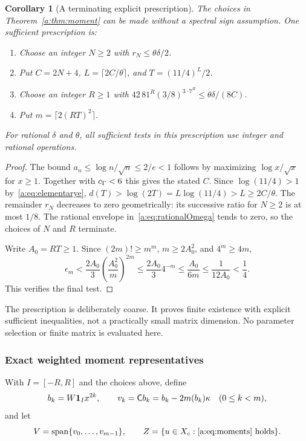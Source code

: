 \documentclass[11pt,a4paper]{article}
\numberwithin{equation}{section}
\newtheorem{corollary}[theorem]{Corollary}
\theoremstyle{definition}\newtheorem{definition}[theorem]{Definition}
\theoremstyle{remark}\newtheorem{remark}[theorem]{Remark}
\begin{document}
\begin{corollary}[A terminating explicit prescription]\label{a:cor:choices}
The choices in Theorem~\ref{a:thm:moment} can be made without a spectral sign assumption. One sufficient prescription is:
\begin{enumerate}
\item Choose an integer $N\ge2$ with $r_N\le\theta\delta/2$.
\item Put $C=2N+4$, $L=\lceil2C/\theta\rceil$, and $T=(11/4)^L/2$.
\item Choose an integer $R\ge1$ with
$42\,81^R(3/8)^{3\cdot7^R}\le\theta\delta/(8C)$.
\item Put $m=\lceil2(RT)^2\rceil$.
\end{enumerate}
For rational $\delta$ and $\theta$, all sufficient tests in this prescription use integer and rational operations.
\end{corollary}
\begin{proof}
The bound $a_n\le\log n/\sqrt n\le2/e<1$ follows by maximizing $\log x/\sqrt x$ for $x\ge1$. Together with $c_\Gamma<6$ this gives the stated $C$. Since $\log(11/4)>1$ by~\eqref{a:eq:elementarye},
$d(T)>\log(2T)=L\log(11/4)>L\ge2C/\theta$.
The remainder $r_N$ decreases to zero geometrically: its successive ratio for $N\ge2$ is at most $1/8$. The rational envelope in~\eqref{a:eq:rationalOmega} tends to zero, so the choices of $N$ and $R$ terminate.

Write $A_0=RT\ge1$. Since $(2m)!\ge m^m$, $m\ge2A_0^2$, and $4^m\ge4m$,
\[
 \epsilon_m<\frac{2A_0}{3}\left(\frac{A_0^2}{m}\right)^{2m}
 \le\frac{2A_0}{3}4^{-m}
 \le\frac{A_0}{6m}\le\frac1{12A_0}<\frac14.
\]
This verifies the final test.
\end{proof}

The prescription is deliberately coarse. It proves finite existence with explicit sufficient inequalities, not a practically small matrix dimension. No parameter selection or finite matrix is evaluated here.

\subsubsection{Exact weighted moment representatives}

With $I=[-R,R]$ and the choices above, define
\begin{equation}\label{a:eq:momentbasis}
 b_k=W\mathbf1_Ix^{2k},\qquad
 v_k=\mathsf Cb_k=b_k-2m(b_k)\kappa\quad(0\le k<m),
\end{equation}
and let
\begin{equation}\label{a:eq:VZ}
 V=\operatorname{span}\{v_0,\ldots,v_{m-1}\},\qquad
 Z=\{u\in X_c:\text{\eqref{a:eq:moments} holds}\}.
\end{equation}
\end{document}
